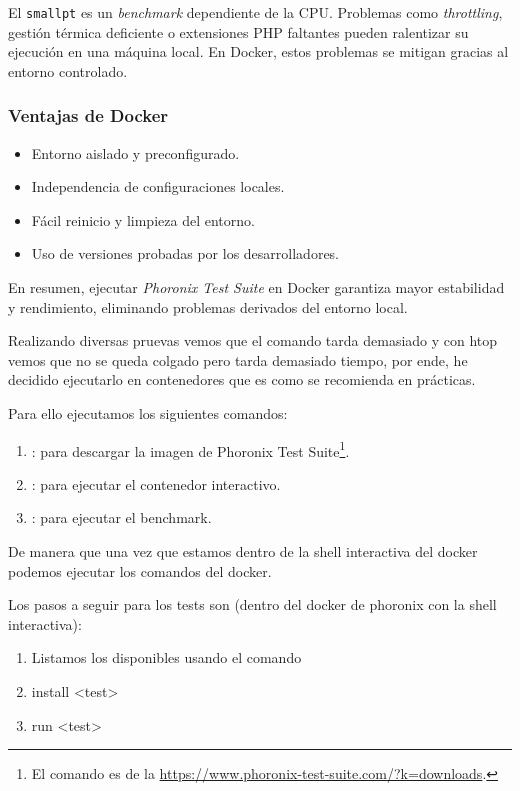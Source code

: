 El \texttt{smallpt} es un \textit{benchmark} dependiente de la CPU. Problemas como \textit{throttling}, gestión térmica deficiente o extensiones PHP faltantes pueden ralentizar su ejecución en una máquina local. En Docker, estos problemas se mitigan gracias al entorno controlado.

\subsubsection{Ventajas de Docker}

\begin{itemize}
    \item Entorno aislado y preconfigurado.
    \item Independencia de configuraciones locales.
    \item Fácil reinicio y limpieza del entorno.
    \item Uso de versiones probadas por los desarrolladores.
\end{itemize}

En resumen, ejecutar \textit{Phoronix Test Suite} en Docker garantiza mayor estabilidad y rendimiento, eliminando problemas derivados del entorno local.



Realizando diversas pruevas vemos que el comando tarda demasiado y con htop vemos que no se queda colgado pero tarda demasiado tiempo, por ende, he decidido ejecutarlo en contenedores que es como se recomienda en prácticas. 


Para ello ejecutamos los siguientes comandos:

\begin{enumerate}
    \item {}: para descargar la imagen de Phoronix Test Suite\footnote{El comando es de la \url{https://www.phoronix-test-suite.com/?k=downloads}.}.
    \item {}: para ejecutar el contenedor interactivo.
    \item {}: para ejecutar el benchmark.
\end{enumerate}

De manera que una vez que estamos dentro de la shell interactiva del docker podemos ejecutar los comandos del docker.

Los pasos a seguir para los tests son (dentro del docker de phoronix con la shell interactiva):
\begin{enumerate}
    \item Listamos los disponibles usando el comando 
    \item install <test>
    \item run <test>
\end{enumerate}

